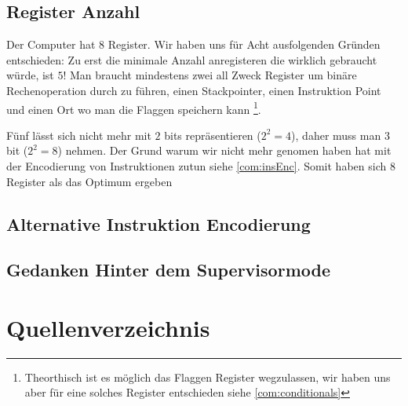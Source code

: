 \documentclass{scrartcl}
\begin{document}
\subsection{\label{section:comment:register_number}Register Anzahl}

Der Computer hat 8 Register. Wir haben uns für Acht ausfolgenden Gründen entschieden:
Zu erst die minimale Anzahl anregisteren die wirklich gebraucht würde, ist $5$! Man braucht mindestens zwei all Zweck Register um binäre Rechenoperation durch zu führen, einen Stackpointer, einen Instruktion Point und einen Ort wo man die Flaggen speichern kann
\footnote{Theorthisch ist es möglich das Flaggen Register wegzulassen, wir haben uns aber für eine solches Register entschieden siehe \autoref{com:conditionals}}.

Fünf lässt sich nicht mehr mit $2$ bits repräsentieren ($2^2 = 4$), daher muss man $3$ bit ($2^2 = 8$) nehmen. Der Grund warum wir nicht mehr genomen haben hat mit der Encodierung von Instruktionen zutun siehe \autoref{com:insEnc}. Somit haben sich $8$ Register als das Optimum ergeben

\subsection{\label{com:insEnc}Alternative Instruktion Encodierung}

\subsection{\label{com:sup}Gedanken Hinter dem Supervisormode}

\section{Quellenverzeichnis}

\printbibliography{}
\end{document}
